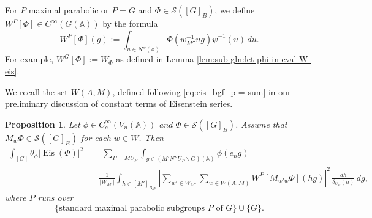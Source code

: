 \documentclass[reqno]{amsart}
\DeclareMathOperator{\Eis}{Eis}
\theoremstyle{plain} \newtheorem{theorem} {Theorem}
\newtheorem{proposition} [theorem] {Proposition}
\theoremstyle{definition} \newtheorem{definition} [theorem] {Definition}
\theoremstyle{itplain} %
\numberwithin{equation}{section}
\numberwithin{theorem}{section}
\begin{document}
For $P$ maximal parabolic or $P = G$ and $\Phi \in \mathcal{S}([G]_B)$, we define $W^P[\Phi] \in C^\infty(G(\mathbb{A}))$ by the formula 
\begin{equation*}
  W^P[\Phi](g) := \int _{u \in N''(\mathbb{A}) } \Phi(w_{M''}^{-1} u g) \psi^{-1}(u) \, d u.
\end{equation*}
For example, $W^G[\Phi] := W_{\Phi}$ as defined in Lemma \ref{lem:sub-gln:let-phi-in-eval-W-eis}.

We recall the set $W(A,M)$, defined following \eqref{eq:eis_bgf_p-=-sum} in our preliminary discussion of constant terms of Eisenstein series.

\begin{proposition}\label{prop:sub-gln:let-phi-in-summary}
  Let $\phi \in C_c^\infty(V_n(\mathbb{A}))$ and $\Phi \in \mathcal{S}([G]_B)$.  Assume that $M_w \Phi \in \mathcal{S}([G]_B)$ for each $w \in W$.  Then
  \begin{align}
     \int _{[G]} \theta_\phi |\Eis(\Phi)|^2  \label{prop:=-sum_p-=}
    &=
     \sum_{P = M {U_P}}
      \int _{g \in (M' N'' {U_P} \backslash G)(\mathbb{A}) } \phi(e_n g) \\ \nonumber
    &\quad
      \frac{1}{|W_{M'}|}
     \int _{h \in [M']_{B_{M'}}}
     \left\lvert
       \sum _{w' \in W_{M'}}
     \sum _{w \in W(A,M)}
       W^P[M_{w' w} \Phi](h g)
     \right\rvert^2
     \, \frac{d h}{\delta_{U_P}(h)}
     \, d g,
  \end{align}
  where $P$ runs over
  \begin{equation*}
    \{\text{standard maximal parabolic subgroups $P$ of $G$}\} \cup \{G\}.
  \end{equation*}
\end{proposition}
\end{document}
